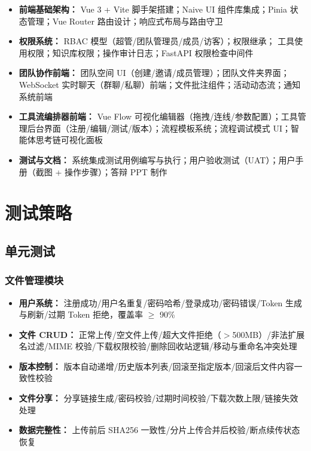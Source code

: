 \documentclass[a4paper,zihao=-4]{ctexart}
\begin{document}
\begin{itemize}
  \item \textbf{前端基础架构：} Vue 3 + Vite 脚手架搭建；Naive UI 组件库集成；Pinia 状态管理；Vue
        Router 路由设计；响应式布局与路由守卫
  \item \textbf{权限系统：} RBAC 模型（超管/团队管理员/成员/访客）；权限继承；
        工具使用权限；知识库权限；操作审计日志；FastAPI 权限检查中间件
  \item \textbf{团队协作前端：} 团队空间 UI（创建/邀请/成员管理）；团队文件夹界面；WebSocket
        实时聊天（群聊/私聊）前端；文件批注组件；活动动态流；通知系统前端
  \item \textbf{工具流编排器前端：} Vue Flow
        可视化编辑器（拖拽/连线/参数配置）；工具管理后台界面（注册/编辑/测试/版本）；流程模板系统；流程调试模式
        UI；智能体思考链可视化面板
  \item \textbf{测试与文档：} 系统集成测试用例编写与执行；用户验收测试（UAT）；用户手册（截图 + 操作步骤）；答辩 PPT 制作
\end{itemize}

\section{测试策略}

\subsection{单元测试}

\subsubsection{文件管理模块}

\begin{itemize}
  \item \textbf{用户系统：} 注册成功/用户名重复/密码哈希/登录成功/密码错误/Token 生成与刷新/过期 Token
        拒绝，覆盖率
        $\geq$ 90\%
  \item \textbf{文件 CRUD：} 正常上传/空文件上传/超大文件拒绝（$>$500MB）/非法扩展名过滤/MIME
        校验/下载权限校验/删除回收站逻辑/移动与重命名冲突处理
  \item \textbf{版本控制：} 版本自动递增/历史版本列表/回滚至指定版本/回滚后文件内容一致性校验
  \item \textbf{文件分享：} 分享链接生成/密码校验/过期时间校验/下载次数上限/链接失效处理
  \item \textbf{数据完整性：} 上传前后 SHA256 一致性/分片上传合并后校验/断点续传状态恢复
\end{itemize}
\end{document}
